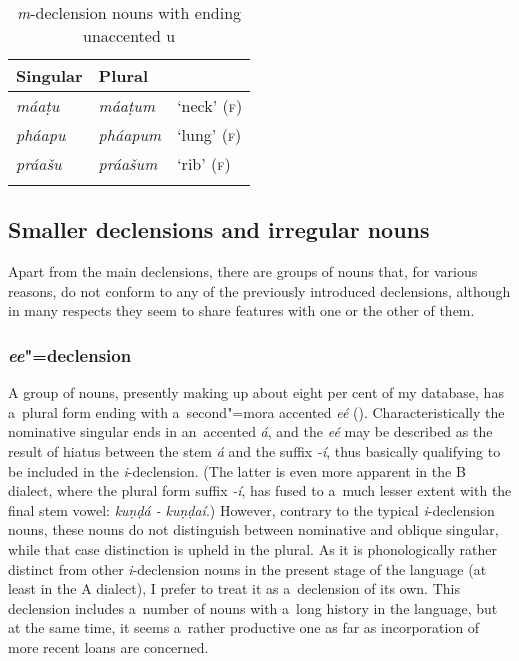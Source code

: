\begin{table}[ht]
\caption{\textit{m}-declension nouns with ending unaccented u}
\begin{tabularx}{\textwidth}{ Q Q Q }
\lsptoprule
Singular &
Plural &
\\\hline
\textit{máaṭu} &
\textit{máaṭum} &
`neck' (\textsc{f})\\
\textit{pháapu} &
\textit{pháapum} &
`lung' (\textsc{f})\\
\textit{práašu} &
\textit{práašum} &
`rib' (\textsc{f})\\\lspbottomrule
\end{tabularx}
\label{tab:4-17}
\end{table}


\subsection{Smaller declensions and irregular nouns}
\label{subsec:4-6-4}

Apart from the main declensions, there are groups of nouns that, for various reasons, do not conform to any of the previously introduced declensions, although in many respects they seem to share features with one or the other of them.

\subsubsection*{\textit{ee}"=declension}

A group of nouns, presently making up about eight per cent of my database, has a~plural form ending with a~second"=mora accented \textit{eé} (). Characteristically the nominative singular ends in an~accented \textit{á}, and the \textit{eé} may be described as the result of hiatus between the stem \textit{á} and the suffix \textit{-í}, thus basically qualifying to be included in the \textit{i}-declension. (The latter is even more apparent in the B dialect, where the plural form suffix \textit{-í}, has fused to a~much lesser extent with the final stem vowel: \textit{kuṇḍá -} \textit{kuṇḍaí}.) However, contrary to the typical \textit{i}-declension nouns, these nouns do not distinguish between nominative and oblique singular, while that case distinction is upheld in the plural. As it is phonologically rather distinct from other \textit{i}-declension nouns in the present stage of the language (at least in the A dialect), I prefer to treat it as a~declension of its own. This declension includes a~number of nouns with a~long history in the language, but at the same time, it seems a~rather productive one as far as incorporation of more recent loans are concerned.


